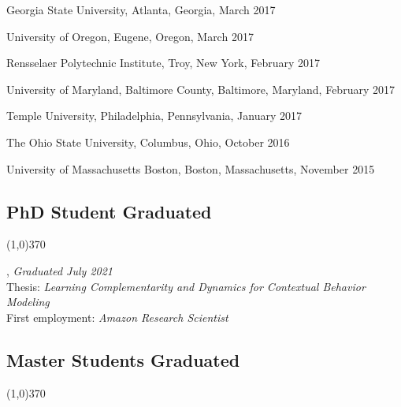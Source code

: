 \documentclass[10pt]{article}
\newenvironment{myindentpar}[1]%
{\begin{list}{}%
         {\setlength{\leftmargin}{#1}}%
         \item[]%
}
{\end{list}}
\newcounter{list}
\begin{document}
\begin{myindentpar}{0.75cm}
\hspace{-0.75cm} Georgia State University, Atlanta, Georgia, March 2017

\hspace{-0.75cm} University of Oregon, Eugene, Oregon, March 2017

\hspace{-0.75cm} Rensselaer Polytechnic Institute, Troy, New York, February 2017

\hspace{-0.75cm} University of Maryland, Baltimore County, Baltimore, Maryland, February 2017

\hspace{-0.75cm} Temple University, Philadelphia, Pennsylvania, January 2017

\hspace{-0.75cm} The Ohio State University, Columbus, Ohio, October 2016

\hspace{-0.75cm} University of Massachusetts Boston, Boston, Massachusetts, November 2015

\end{myindentpar}

\subsection{\sc PhD Student Graduated}
\vspace{-0.4cm} \line(1,0){370} \vspace{-0.1cm}

\begin{myindentpar}{0.75cm}

\hspace{-0.75cm}{\bf Daheng Wang}, \textit{Graduated July 2021} \\
	{Thesis: \textit{Learning Complementarity and Dynamics for Contextual Behavior Modeling}} \\
	{First employment: \textit{Amazon Research Scientist}}

\end{myindentpar}
	
\subsection{\sc Master Students Graduated}
\vspace{-0.4cm} \line(1,0){370} \vspace{-0.1cm}
\end{document}

